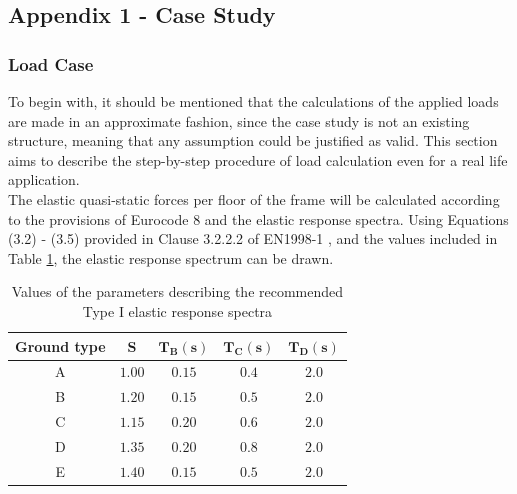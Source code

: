 




\subsection{Appendix 1 - Case Study}

\subsubsection{Load Case} \label{annexLoad}

To begin with, it should be mentioned that the calculations of the applied loads are made in an approximate fashion, since the case study is not an existing structure, meaning that any assumption could be justified as valid. This section aims to describe the step-by-step procedure of load calculation even for a real life application.\\

The elastic quasi-static forces per floor of the frame will be calculated according to the provisions of Eurocode 8 and the elastic response spectra. Using Equations (3.2) - (3.5) provided in Clause 3.2.2.2 of EN1998-1 \cite{EC8}, and the values included in Table \ref{spec1params}, the elastic response spectrum can be drawn\footnotemark.


\begin{table}[H]
    \centering
    \caption{Values of the parameters describing the recommended Type I elastic response spectra \cite{EC8}}
    \label{spec1params}
    \begin{tabular}{ccccc}
        \toprule
        \textbf{Ground type} & $\boldsymbol{S}$ & $\boldsymbol{T_B(s)}$ & $\boldsymbol{T_C(s)}$ & $\boldsymbol{T_D(s)}$ \\
        \midrule
        A & $1.00$ & $0.15$ & $0.4$ & $2.0$ \\
        B & $1.20$ & $0.15$ & $0.5$ & $2.0$ \\
        C & $1.15$ & $0.20$ & $0.6$ & $2.0$ \\
        D & $1.35$ & $0.20$ & $0.8$ & $2.0$ \\
        E & $1.40$ & $0.15$ & $0.5$ & $2.0$ \\
        \bottomrule
    \end{tabular}
\end{table}

